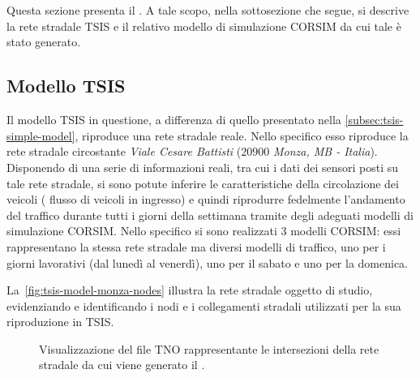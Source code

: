 \cleardoublepage
\section{}\label{sec:dataset-2}
Questa sezione presenta il . A tale scopo, nella sottosezione che segue, si descrive la rete stradale \acs{TSIS} e il relativo modello di simulazione \acs{CORSIM} da cui tale  è stato generato.

\subsection{Modello TSIS}\label{subsec:tsis-monza-model}
Il modello \acs{TSIS} in questione, a differenza di quello presentato nella \autoref{subsec:tsis-simple-model}, riproduce una rete stradale reale. Nello specifico esso riproduce la rete stradale circostante \emph{Viale Cesare Battisti} ($20900$ \emph{Monza, MB - Italia}). Disponendo di una serie di informazioni reali, tra cui i dati dei sensori posti su tale rete stradale, si sono potute inferire le caratteristiche della circolazione dei veicoli (\eg{} flusso di veicoli in ingresso) e quindi riprodurre fedelmente l'andamento del traffico durante tutti i giorni della settimana tramite degli adeguati modelli di simulazione \acs{CORSIM}. Nello specifico si sono realizzati $3$ modelli \acs{CORSIM}: essi rappresentano la stessa rete stradale ma diversi modelli di traffico, uno per i giorni lavorativi (dal lunedì al venerdì), uno per il sabato e uno per la domenica.

La~\vref{fig:tsis-model-monza-nodes} illustra la rete stradale oggetto di studio, evidenziando e identificando i nodi e i collegamenti stradali utilizzati per la sua riproduzione in \acs{TSIS}.
\begin{figure}
  \centering
  \captionsetup[subfigure]{labelformat=empty}
  \label{fig:tsis-model-monza-nodes}
\end{figure}
\begin{figure}[ht]
  \centering
  \captionsetup{type=figure}
  \captionsetup[subfigure]{labelformat=empty}
  \caption[Intersezioni della rete stradale del ]{Visualizzazione del file \acs{TNO} rappresentante le intersezioni della rete stradale da cui viene generato il .}
\end{figure}

